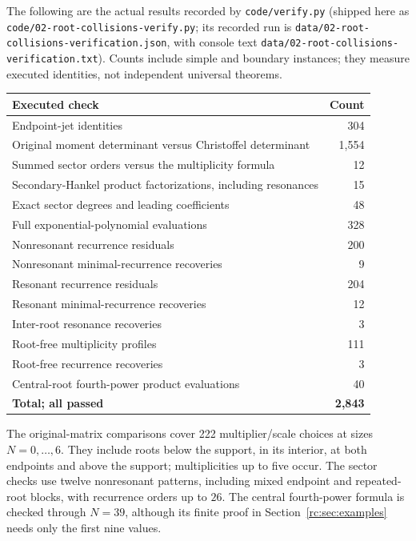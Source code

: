 \documentclass[11pt,a4paper]{article}
\numberwithin{equation}{section}
\theoremstyle{definition}
\theoremstyle{remark}
\begin{document}
The following are the actual results recorded by
\texttt{code/verify.py} (shipped here as
\nolinkurl{code/02-root-collisions-verify.py}; its recorded run is
\nolinkurl{data/02-root-collisions-verification.json}, with console
text \nolinkurl{data/02-root-collisions-verification.txt}).  Counts include simple and boundary instances;
they measure executed identities, not independent universal theorems.
\begin{center}
\small\renewcommand{\arraystretch}{1.15}
\begin{tabular}{@{}p{}r@{}}
\toprule
Executed check & Count\\
\midrule
Endpoint-jet identities & 304\\
Original moment determinant versus Christoffel determinant & 1,554\\
Summed sector orders versus the multiplicity formula & 12\\
Secondary-Hankel product factorizations, including resonances & 15\\
Exact sector degrees and leading coefficients & 48\\
Full exponential-polynomial evaluations & 328\\
Nonresonant recurrence residuals & 200\\
Nonresonant minimal-recurrence recoveries & 9\\
Resonant recurrence residuals & 204\\
Resonant minimal-recurrence recoveries & 12\\
Inter-root resonance recoveries & 3\\
Root-free multiplicity profiles & 111\\
Root-free recurrence recoveries & 3\\
Central-root fourth-power product evaluations & 40\\
\midrule
\textbf{Total; all passed} & \textbf{2,843}\\
\bottomrule
\end{tabular}
\end{center}
The original-matrix comparisons cover 222 multiplier/scale choices at
sizes $N=0,\ldots,6$.  They include roots below the support, in its
interior, at both endpoints and above the support; multiplicities up to
five occur.  The sector checks use twelve nonresonant patterns, including
mixed endpoint and repeated-root blocks, with recurrence orders up to
$26$.  The central fourth-power formula is checked through $N=39$,
although its finite proof in Section~\ref{rc:sec:examples} needs only the
first nine values.
\end{document}
